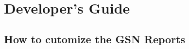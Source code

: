 \graphicspath{{chapters/ch-developer-guide/figures/}}

\chapter{Developer's Guide}



\section{How to cutomize the GSN Reports}
